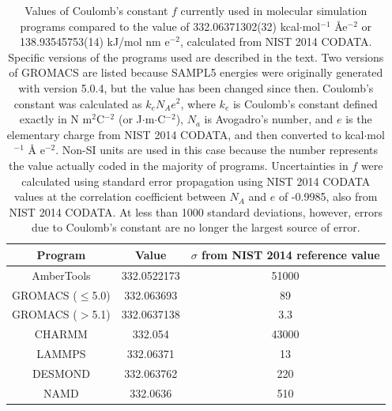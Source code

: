 \begin{table}
\caption{Values of Coulomb's constant $f$ currently used in molecular
  simulation programs compared to the value of 332.06371302(32)
  kcal$\cdot$mol$^{-1}$ \AA e$^{-2}$ or 138.93545753(14) kJ/mol nm
  e$^{-2}$, calculated from NIST 2014 CODATA.  Specific versions of the programs
  used are described in the text. Two versions of GROMACS are listed
  because SAMPL5 energies were originally generated with version
  5.0.4, but the value has been changed since then. Coulomb's constant
  was calculated as $k_e N_A e^2$, where $k_e$ is Coulomb's constant
  defined exactly in N m$^2$C$^{-2}$ (or J$\cdot$m$\cdot$C$^{-2}$),
  $N_a$ is Avogadro's number, and $e$ is the elementary charge from
  NIST 2014 CODATA, and then converted to kcal$\cdot$mol$^{-1}$ \AA
  e$^{-2}$. Non-SI units are used in this case because the number
  represents the value actually coded in the majority of programs.
  Uncertainties in $f$ were calculated using standard error
  propagation using NIST 2014 CODATA values at the correlation
  coefficient between $N_A$ and $e$ of -0.9985, also from NIST 2014
  CODATA. At less than 1000 standard deviations, however, errors due
  to Coulomb's constant are no longer the largest source of
  error.\label{tab:delfromnist}}
\begin{center}
\begin{tabular}{|ccc|}
\hline
Program & Value & $\sigma$ from NIST 2014 reference value \\
\hline
AmberTools &  332.0522173 & 51000 \\
GROMACS ($\leq$5.0) & 332.063693 & 89 \\
GROMACS ($>$5.1) & 332.0637138 & 3.3 \\ 
CHARMM & 332.054 & 43000 \\
LAMMPS & 332.06371 &  13 \\
DESMOND & 332.063762 & 220 \\
NAMD & 332.0636 & 510 \\
\hline
\end{tabular}
\end{center}
\end{table}


